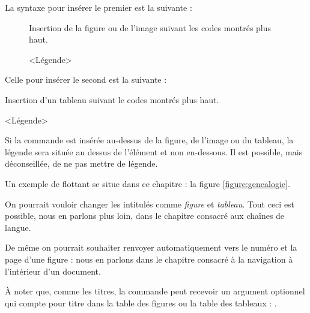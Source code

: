 La syntaxe pour insérer le premier est la suivante :

\begin{latexcode}
\begin{figure}[<paramètre de placement>]
	Insertion de la figure ou de l'image suivant les codes montrés plus haut.
	\caption{<Légende>}
\end{figure} 
\end{latexcode}

Celle pour insérer le second est la suivante :
\begin{latexcode}
\begin{table}[<paramètre de placement>]
	Insertion d'un tableau suivant le codes montrés plus haut.
	\caption{<Légende>}
\end{table} 
\end{latexcode}

Si la commande  est insérée au-dessus de la figure, de l'image ou du tableau, la légende sera située au dessus de l'élément et non en-dessous. Il est possible, mais déconseillée, de ne pas mettre de légende.

Un exemple de flottant se situe  dans ce chapitre : la figure \ref{figure:genealogie}.
\begin{attention}
	On pourrait vouloir changer les intitulés comme \emph{figure} et \emph{tableau}. Tout ceci est possible, nous en parlons plus loin, dans le chapitre consacré aux chaînes de langue.
	
	De même on pourrait souhaiter renvoyer automatiquement vers le numéro et la page d'une figure : nous en parlons dans le chapitre consacré à la navigation à l'intérieur d'un document.
\end{attention}

À noter que, comme les titres, la commande  peut recevoir un argument optionnel qui compte pour titre dans la table des figures ou la table des tableaux :
.


